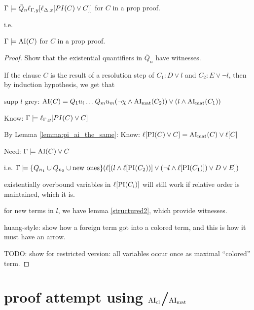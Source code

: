 \documentclass[,%
	paper=a4,%
	DIV14, 
	liststotoc,
	bibtotoc,
	draft=false,%
	numbers=noendperiod
]{scrartcl}
\begin{document}
\begin{lemma}
	$\Gamma \models \bar Q_n  \ell_{\Gamma,y}[ \ell_{\Delta,x}[PI(C)\lor C] ] $ for $C$ in a prop proof.

	i.e.

	$\Gamma \models \operatorname{AI}(C) $ for $C$ in a prop proof.
\end{lemma}
\begin{proof}
	Show that the existential quantifiers in $\bar Q_n$ have witnesses.

	If the clause $C$ is the result of a resolution step of $C_1: D \lor l$ and $C_2: E \lor \lnot l$, then by induction hypothesis, we get that

	supp $l$ grey:
	$\operatorname{AI}(C) = Q_1 u_i\dots Q_m u_m (\lnot \chi \land \operatorname{AI}_\mathrm{mat}(C_2)) \lor (l \land \operatorname{AI}_\mathrm{mat}(C_1)) $

	Know:   $\Gamma \models  \ell_{\Gamma,y}[{PI(C)\lor C} ]$

	By Lemma \ref{lemma:pi_ai_the_same}:
	Know:   $  \ell[{{\operatorname{PI}(C)\lor C} }] = \operatorname{AI}_\mathrm{mat}(C) \lor \ell[C]$


	Need:
	$\Gamma \models \operatorname{AI}(C) \lor C$ 

	i.e.
	$\Gamma \models \{Q_{n_1} \cup Q_{n_2} \cup \text{new ones}\} ( \ell[(l \land \ell[ \operatorname{PI}(C_2)) ] \lor (\lnot l \land \ell[\operatorname{PI}(C_1)]) \lor D \lor E ])$



	existentially overbound variables in $\ell[\operatorname{PI}(C_i)]$ will still work if relative order is maintained, which it is.

	for new terms in $l$, we have lemma \ref{structured2}, which provide witnesses.

	huang-style: show how a foreign term got into a colored term, and this is how it must have an arrow.


	TODO: show for restricted version: all variables occur once as maximal ``colored'' term. 




\end{proof}


\clearpage

\section{proof attempt using $\operatorname{AI}_\mathrm{cl}$/$\operatorname{AI}_\mathrm{mat}$}
\end{document}
